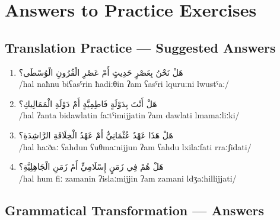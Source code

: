 \documentclass[letterpaper,12pt]{article}
\begin{document}
\section{Answers to Practice Exercises}

\subsection{Translation Practice — Suggested Answers}

\begin{enumerate}
\item \textarabic{هَلْ نَحْنُ بِعَصْرٍ حَدِيثٍ أَمْ عَصْرِ الْقُرُونِ الْوُسْطَى؟}\\
/hal naħnu biʕasˤrin ħadiːθin ʔam ʕasˤri lquruːni lwustˤaː/

\item \textarabic{هَلْ أَنْتَ بِدَوْلَةٍ فَاطِمِيَّةٍ أَمْ دَوْلَةِ الْمَمَالِيكِ؟}\\
/hal ʔanta bidawlatin faːtˤimijjatin ʔam dawlati lmamaːliːki/

\item \textarabic{هَلْ هَذَا عَهْدٌ عُثْمَانِيٌّ أَمْ عَهْدُ الْخِلَافَةِ الرَّاشِدَةِ؟}\\
/hal haːðaː ʕahdun ʕuθmaːnijjun ʔam ʕahdu lxilaːfati rraːʃidati/

\item \textarabic{هَلْ هُمْ فِي زَمَنٍ إِسْلَامِيٍّ أَمْ زَمَنِ الْجَاهِلِيَّةِ؟}\\
/hal hum fiː zamanin ʔislaːmijjin ʔam zamani ldʒaːhillijjati/
\end{enumerate}

\subsection{Grammatical Transformation — Answers}
\end{document}
